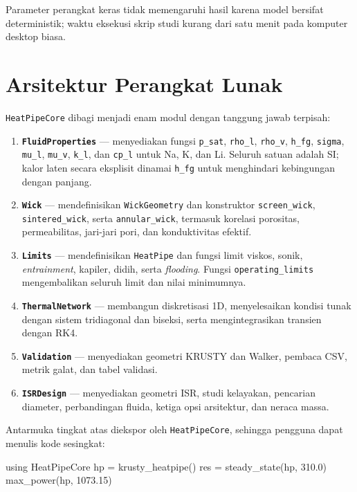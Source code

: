 \documentclass[
  indonesian,
  12pt,
  a4paper,
]{report}
\newenvironment{Shaded}{\begin{snugshade}}{\end{snugshade}}
\newcommand{\BuiltInTok}[1]{\textcolor[rgb]{0.00,0.23,0.31}{#1}}
\newcommand{\FloatTok}[1]{\textcolor[rgb]{0.68,0.00,0.00}{#1}}
\newcommand{\FunctionTok}[1]{\textcolor[rgb]{0.28,0.35,0.67}{#1}}
\newcommand{\ImportTok}[1]{\textcolor[rgb]{0.00,0.46,0.62}{#1}}
\newcommand{\NormalTok}[1]{\textcolor[rgb]{0.00,0.23,0.31}{#1}}
\newcommand{\OperatorTok}[1]{\textcolor[rgb]{0.37,0.37,0.37}{#1}}
\providecommand{\tightlist}{%
  \setlength{\itemsep}{0pt}\setlength{\parskip}{0pt}}
\begin{document}
Parameter perangkat keras tidak memengaruhi hasil karena model bersifat
deterministik; waktu eksekusi skrip studi kurang dari satu menit pada
komputer desktop biasa.

\section{Arsitektur Perangkat Lunak}\label{arsitektur-perangkat-lunak}

\texttt{HeatPipeCore} dibagi menjadi enam modul dengan tanggung jawab
terpisah:

\begin{enumerate}
\def\labelenumi{\arabic{enumi}.}
\tightlist
\item
  \textbf{\texttt{FluidProperties}} --- menyediakan fungsi
  \texttt{p\_sat}, \texttt{rho\_l}, \texttt{rho\_v}, \texttt{h\_fg},
  \texttt{sigma}, \texttt{mu\_l}, \texttt{mu\_v}, \texttt{k\_l}, dan
  \texttt{cp\_l} untuk Na, K, dan Li. Seluruh satuan adalah SI; kalor
  laten secara eksplisit dinamai \texttt{h\_fg} untuk menghindari
  kebingungan dengan panjang.
\item
  \textbf{\texttt{Wick}} --- mendefinisikan \texttt{WickGeometry} dan
  konstruktor \texttt{screen\_wick}, \texttt{sintered\_wick}, serta
  \texttt{annular\_wick}, termasuk korelasi porositas, permeabilitas,
  jari-jari pori, dan konduktivitas efektif.
\item
  \textbf{\texttt{Limits}} --- mendefinisikan \texttt{HeatPipe} dan
  fungsi limit viskos, sonik, \emph{entrainment}, kapiler, didih, serta
  \emph{flooding}. Fungsi \texttt{operating\_limits} mengembalikan
  seluruh limit dan nilai minimumnya.
\item
  \textbf{\texttt{ThermalNetwork}} --- membangun diskretisasi 1D,
  menyelesaikan kondisi tunak dengan sistem tridiagonal dan biseksi,
  serta mengintegrasikan transien dengan RK4.
\item
  \textbf{\texttt{Validation}} --- menyediakan geometri KRUSTY dan
  Walker, pembaca CSV, metrik galat, dan tabel validasi.
\item
  \textbf{\texttt{ISRDesign}} --- menyediakan geometri ISR, studi
  kelayakan, pencarian diameter, perbandingan fluida, ketiga opsi
  arsitektur, dan neraca massa.
\end{enumerate}

Antarmuka tingkat atas diekspor oleh \texttt{HeatPipeCore}, sehingga
pengguna dapat menulis kode sesingkat:

\begin{Shaded}
\begin{Highlighting}[]
\ImportTok{using} \BuiltInTok{HeatPipeCore}
\NormalTok{hp }\OperatorTok{=} \FunctionTok{krusty\_heatpipe}\NormalTok{()}
\NormalTok{res }\OperatorTok{=} \FunctionTok{steady\_state}\NormalTok{(hp, }\FloatTok{310.0}\NormalTok{)}
\FunctionTok{max\_power}\NormalTok{(hp, }\FloatTok{1073.15}\NormalTok{)}
\end{Highlighting}
\end{Shaded}
\end{document}
